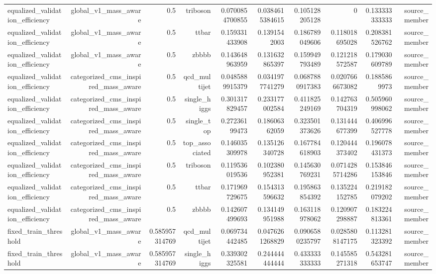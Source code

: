 \begin{table}[htbp]
{\begin{tabular}{lrrrrrrrrr}
equalized\_validation\_efficiency & global\_v1\_mass\_aware & 0.5 & triboson & 0.0700854700855 & 0.0384615384615 & 0.105128205128 & 0 & 0.133333333333 & source\_member \\
equalized\_validation\_efficiency & global\_v1\_mass\_aware & 0.5 & ttbar & 0.159331433908 & 0.1391542003 & 0.186789049606 & 0.118018695028 & 0.208381526762 & source\_member \\
equalized\_validation\_efficiency & global\_v1\_mass\_aware & 0.5 & zbbbb & 0.143648963959 & 0.131632865397 & 0.159949793489 & 0.121218572587 & 0.179030609789 & source\_member \\
equalized\_validation\_efficiency & categorized\_cms\_inspired\_mass\_aware & 0.5 & qcd\_multijet & 0.0485889915379 & 0.0341977741279 & 0.0687880917383 & 0.0207666673082 & 0.1885869973 & source\_member \\
equalized\_validation\_efficiency & categorized\_cms\_inspired\_mass\_aware & 0.5 & single\_higgs & 0.301317829457 & 0.233177002584 & 0.411825249169 & 0.142763704319 & 0.505960998062 & source\_member \\
equalized\_validation\_efficiency & categorized\_cms\_inspired\_mass\_aware & 0.5 & single\_top & 0.27236199473 & 0.18606362059 & 0.323501373626 & 0.131444677399 & 0.406996527778 & source\_member \\
equalized\_validation\_efficiency & categorized\_cms\_inspired\_mass\_aware & 0.5 & top\_associated & 0.146035309978 & 0.135126340728 & 0.167784618903 & 0.120444373402 & 0.196078431373 & source\_member \\
equalized\_validation\_efficiency & categorized\_cms\_inspired\_mass\_aware & 0.5 & triboson & 0.119536019536 & 0.102380952381 & 0.145630769231 & 0.0714285714286 & 0.153846153846 & source\_member \\
equalized\_validation\_efficiency & categorized\_cms\_inspired\_mass\_aware & 0.5 & ttbar & 0.171969729675 & 0.154313596632 & 0.195863854392 & 0.135224152785 & 0.219182079202 & source\_member \\
equalized\_validation\_efficiency & categorized\_cms\_inspired\_mass\_aware & 0.5 & zbbbb & 0.142607499693 & 0.134149951988 & 0.163118978062 & 0.120907298887 & 0.183224813361 & source\_member \\
fixed\_train\_threshold & global\_v1\_mass\_aware & 0.585957314769 & qcd\_multijet & 0.069734442485 & 0.0476261268829 & 0.0906580235797 & 0.0285808147175 & 0.113281323392 & source\_member \\
fixed\_train\_threshold & global\_v1\_mass\_aware & 0.585957314769 & single\_higgs & 0.339302325581 & 0.244444444444 & 0.433333333333 & 0.145585271318 & 0.543281653747 & source\_member \\

\end{tabular}}
\end{table}
